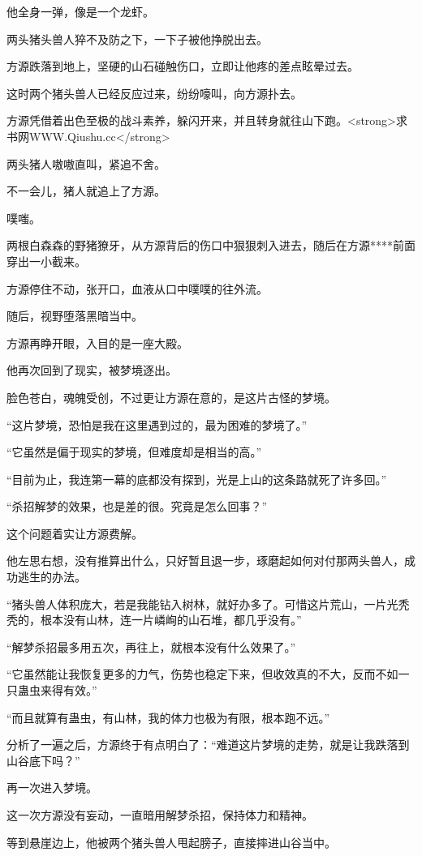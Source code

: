 \begin{this_body}
他全身一弹，像是一个龙虾。

两头猪头兽人猝不及防之下，一下子被他挣脱出去。

方源跌落到地上，坚硬的山石碰触伤口，立即让他疼的差点眩晕过去。

这时两个猪头兽人已经反应过来，纷纷嚎叫，向方源扑去。

方源凭借着出色至极的战斗素养，躲闪开来，并且转身就往山下跑。<strong>求书网WWW.Qiushu.cc</strong>

两头猪人嗷嗷直叫，紧追不舍。

不一会儿，猪人就追上了方源。

噗嗤。

两根白森森的野猪獠牙，从方源背后的伤口中狠狠刺入进去，随后在方源****前面穿出一小截来。

方源停住不动，张开口，血液从口中噗噗的往外流。

随后，视野堕落黑暗当中。

方源再睁开眼，入目的是一座大殿。

他再次回到了现实，被梦境逐出。

脸色苍白，魂魄受创，不过更让方源在意的，是这片古怪的梦境。

“这片梦境，恐怕是我在这里遇到过的，最为困难的梦境了。”

“它虽然是偏于现实的梦境，但难度却是相当的高。”

“目前为止，我连第一幕的底都没有探到，光是上山的这条路就死了许多回。”

“杀招解梦的效果，也是差的很。究竟是怎么回事？”

这个问题着实让方源费解。

他左思右想，没有推算出什么，只好暂且退一步，琢磨起如何对付那两头兽人，成功逃生的办法。

“猪头兽人体积庞大，若是我能钻入树林，就好办多了。可惜这片荒山，一片光秃秃的，根本没有山林，连一片嶙峋的山石堆，都几乎没有。”

“解梦杀招最多用五次，再往上，就根本没有什么效果了。”

“它虽然能让我恢复更多的力气，伤势也稳定下来，但收效真的不大，反而不如一只蛊虫来得有效。”

“而且就算有蛊虫，有山林，我的体力也极为有限，根本跑不远。”

分析了一遍之后，方源终于有点明白了：“难道这片梦境的走势，就是让我跌落到山谷底下吗？”

再一次进入梦境。

这一次方源没有妄动，一直暗用解梦杀招，保持体力和精神。

等到悬崖边上，他被两个猪头兽人甩起膀子，直接摔进山谷当中。


\end{this_body}
